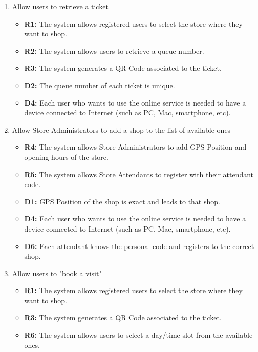 \documentclass[table, 12pt]{article}
\begin{document}
\begin{enumerate}[label=\textbf{-G\arabic*}:]
    \item {Allow users to retrieve a ticket
          \begin{itemize}
              \item \textbf{R1:} The system allows registered users to select the store where they want to shop.
              \item \textbf{R2:} The system allows users to retrieve a queue number.
              \item \textbf{R3:} The system generates a QR Code associated to the ticket.
              \item \textbf{D2:} The queue number of each ticket is unique.
              \item \textbf{D4:} Each user who wants to use the online service is needed to have a device connected to Internet (such as PC, Mac, smartphone, etc).
          \end{itemize}
          }
    \item {Allow Store Administrators to add a shop to the list of available ones
          \begin{itemize}
              \item\textbf{R4:} The system allows Store Administrators to add GPS Position and opening hours of the store.
              \item \textbf{R5:} The system allows Store Attendants to register with their attendant code.
              \item \textbf{D1:} GPS Position of the shop is exact and leads to that shop.
              \item \textbf{D4:} Each user who wants to use the online service is needed to have a device connected to Internet (such as PC, Mac, smartphone, etc).
              \item \textbf{D6:} Each attendant knows the personal code and registers to the correct shop.
          \end{itemize}
          }
    \item {Allow users to "book a visit"
          \begin{itemize}
              \item \textbf{R1:} The system allows registered users to select the store where they want to shop.
              \item \textbf{R3:} The system generates a QR Code associated to the ticket.
              \item \textbf{R6:} The system allows users to select a day/time slot from the available ones.

\end{itemize}}
\end{enumerate}
\end{document}
